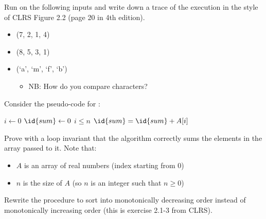 \documentclass{article}
\begin{document}
\thispagestyle{fancy}

\begin{Exercise}

    \Question
    Run  on the following inputs and write down a trace of
    the execution in the style of CLRS Figure 2.2 (page 20 in 4th edition).

    \begin{itemize}
        \item (7, 2, 1, 4)
        \item (8, 5, 3, 1)
        \item (`a', `m', `f', `b')
            \begin{itemize}
                \item NB: How do you compare characters?
            \end{itemize}
    \end{itemize}

\end{Exercise}

\begin{Exercise}

    \noindent
    Consider the pseudo-code for :
    
    \begin{codebox}
        \li $i \gets 0$
        \li $\id{sum} \gets 0$
        \li \While $i \leq n$ \Then
            \li $\id{sum} = \id{sum} + A[i]$
        \End
        \li \Return {}
    \end{codebox}

    \Question
    Prove with a loop invariant that the algorithm correctly sums the elements
    in the array passed to it. Note that:

    \begin{itemize}
        \item $A$ is an array of real numbers (index starting from 0)
        \item $n$ is the size of $A$ (so $n$ is an integer such that $n \geq 0$)
    \end{itemize}

\end{Exercise}
    
\begin{Exercise}
    \Question
    Rewrite the  procedure to sort into monotonically
    decreasing order instead of monotonically increasing order (this is exercise
    2.1-3 from CLRS).
\end{Exercise}
\end{document}
